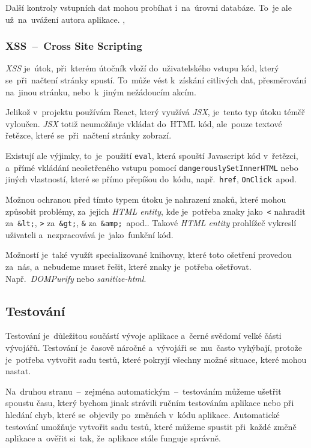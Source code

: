\documentclass[10pt,a4paper]{article}
\begin{document}
                Další kontroly vstupních dat mohou probíhat i~na~úrovni databáze. To~je ale už~na~uvážení autora aplikace. \cite{w3s:SQLInjection}, \cite{itnetwork:SQLInjection}

            \subsubsection{XSS~--~Cross Site Scripting}
                \emph{XSS} je~útok, při~kterém útočník vloží do~uživatelského vstupu kód, který se~při~načtení stránky spustí. To~může vést k~získání citlivých dat, přesměrování na~jinou stránku, nebo~k~jiným nežádoucím akcím.

                Jelikož v~projektu používám React, který využívá \emph{JSX}, je~tento typ útoku téměř vyloučen. \emph{JSX} totiž neumožňuje vkládat do~HTML kód, ale~pouze textové řetězce, které se~při~načtení stránky zobrazí.

                Existují ale výjimky, to~je~použití \texttt{eval}, která spouští Javascript kód v~řetězci, a~přímé vkládání neošetřeného vstupu pomocí \texttt{dangerouslySetInnerHTML} nebo jiných vlastností, které se přímo přepíšou do~kódu, např.~\texttt{href}, \texttt{OnClick}~apod.

                Možnou ochranou před tímto typem útoku je nahrazení znaků, které mohou způsobit problémy, za~jejich \emph{HTML entity}, kde je~potřeba znaky jako~\texttt{<} nahradit za~\texttt{\&lt;}, \texttt{>} za~\texttt{\&gt;}, \texttt{\&} za~\texttt{\&amp;}~apod.. Takové \emph{HTML entity} prohlížeč vykreslí uživateli a~nezpracovává je~jako~funkční kód.
                
                Možností je~také využít specializované knihovny, které toto ošetření provedou za~nás, a~nebudeme muset řešit, které znaky je~potřeba ošetřovat. Např.~\emph{DOMPurify} nebo \emph{sanitize-html}. \cite{medium:XSS}

        \subsection{Testování}
            Testování je~důležitou součástí vývoje aplikace a~černé svědomí velké části vývojářů. Testování je~časově náročné a~vývojáři se~mu~často vyhýbají, protože je~potřeba vytvořit sadu testů, které pokryjí všechny možné situace, které mohou nastat.
            
            Na~druhou stranu~--~zejména automatickým~--~testováním můžeme ušetřit spoustu času, který bychom jinak strávili ručním testováním aplikace nebo při hledání chyb, které se~objevily po~změnách v~kódu aplikace. Automatické testování umožňuje vytvořit sadu testů, které můžeme spustit při~každé změně aplikace a~ověřit si~tak, že~aplikace stále funguje správně.
            
\end{document}
